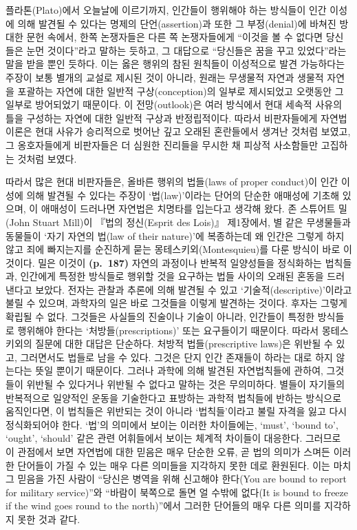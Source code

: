 플라톤(Plato)에서 오늘날에 이르기까지, 인간들이 행위해야 하는 방식들이
인간 이성에 의해 발견될 수 있다는 명제의 단언(assertion)과 또한 그
부정(denial)에 바쳐진 방대한 문헌 속에서, 한쪽 논쟁자들은 다른 쪽
논쟁자들에게 “이것을 볼 수 없다면 당신들은 눈먼 것이다”라고 말하는
듯하고, 그 대답으로 “당신들은 꿈을 꾸고 있었다”라는 말을 받을 뿐인
듯하다. 이는 옳은 행위의 참된 원칙들이 이성적으로 발견 가능하다는 주장이
보통 별개의 교설로 제시된 것이 아니라, 원래는 무생물적 자연과 생물적
자연을 포괄하는 자연에 대한 일반적 구상(conception)의 일부로 제시되었고
오랫동안 그 일부로 방어되었기 때문이다. 이 전망(outlook)은 여러 방식에서
현대 세속적 사유의 틀을 구성하는 자연에 대한 일반적 구상과 반정립적이다.
따라서 비판자들에게 자연법 이론은 현대 사유가 승리적으로 벗어난 깊고
오래된 혼란들에서 생겨난 것처럼 보였고, 그 옹호자들에게 비판자들은 더
심원한 진리들을 무시한 채 피상적 사소함들만 고집하는 것처럼 보였다.

따라서 많은 현대 비판자들은, 올바른 행위의 법들(laws of proper
conduct)이 인간 이성에 의해 발견될 수 있다는 주장이 ‘법(law)’이라는
단어의 단순한 애매성에 기초해 있으며, 이 애매성이 드러나면 자연법은
치명타를 입는다고 생각해 왔다. 존 스튜어트 밀(John Stuart Mill)이 『법의
정신(Esprit des Lois)』 제1장에서, 별 같은 무생물들과 동물들이 ‘자기
자연의 법(law of their nature)’에 복종하는데 왜 인간은 그렇게 하지 않고
죄에 빠지는지를 순진하게 묻는 몽테스키외(Montesquieu)를 다룬 방식이 바로
이것이다. 밀은 이것이 \textbf{(p.~187)} 자연의 과정이나 반복적
일양성들을 정식화하는 법칙들과, 인간에게 특정한 방식들로 행위할 것을
요구하는 법들 사이의 오래된 혼동을 드러낸다고 보았다. 전자는 관찰과
추론에 의해 발견될 수 있고 ‘기술적(descriptive)’이라고 불릴 수 있으며,
과학자의 일은 바로 그것들을 이렇게 발견하는 것이다. 후자는 그렇게 확립될
수 없다. 그것들은 사실들의 진술이나 기술이 아니라, 인간들이 특정한
방식들로 행위해야 한다는 ‘처방들(prescriptions)’ 또는 요구들이기
때문이다. 따라서 몽테스키외의 질문에 대한 대답은 단순하다. 처방적
법들(prescriptive laws)은 위반될 수 있고, 그러면서도 법들로 남을 수
있다. 그것은 단지 인간 존재들이 하라는 대로 하지 않는다는 뜻일 뿐이기
때문이다. 그러나 과학에 의해 발견된 자연법칙들에 관하여, 그것들이 위반될
수 있다거나 위반될 수 없다고 말하는 것은 무의미하다. 별들이 자기들의
반복적으로 일양적인 운동을 기술한다고 표방하는 과학적 법칙들에 반하는
방식으로 움직인다면, 이 법칙들은 위반되는 것이 아니라 ‘법칙들’이라고
불릴 자격을 잃고 다시 정식화되어야 한다. ‘법’의 의미에서 보이는 이러한
차이들에는, `must', `bound to', `ought', `should' 같은 관련 어휘들에서
보이는 체계적 차이들이 대응한다. 그러므로 이 관점에서 보면 자연법에 대한
믿음은 매우 단순한 오류, 곧 법의 의미가 스며든 이러한 단어들이 가질 수
있는 매우 다른 의미들을 지각하지 못한 데로 환원된다. 이는 마치 그 믿음을
가진 사람이 “당신은 병역을 위해 신고해야 한다(You are bound to report
for military service)”와 “바람이 북쪽으로 돌면 얼 수밖에 없다(It is
bound to freeze if the wind goes round to the north)”에서 그러한
단어들의 매우 다른 의미를 지각하지 못한 것과 같다.

